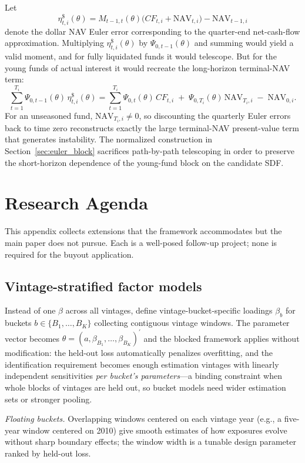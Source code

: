\documentclass[11pt]{article}
\begin{document}
Let
\[
\eta^{\$}_{t,i}(\theta)
=
M_{t-1,t}(\theta)\bigl(CF_{t,i}+\mathrm{NAV}_{t,i}\bigr)
-\mathrm{NAV}_{t-1,i}
\]
denote the dollar NAV Euler error corresponding to the quarter-end net-cash-flow approximation. Multiplying \(\eta^{\$}_{t,i}(\theta)\) by \(\Psi_{0,t-1}(\theta)\) and summing would yield a valid moment, and for fully liquidated funds it would telescope. But for the young funds of actual interest it would recreate the long-horizon terminal-NAV term:
\[
\sum_{t=1}^{T_i}\Psi_{0,t-1}(\theta)\,\eta^{\$}_{t,i}(\theta)
=
\sum_{t=1}^{T_i}\Psi_{0,t}(\theta)\,CF_{t,i}
\;+\;
\Psi_{0,T_i}(\theta)\,\mathrm{NAV}_{T_i,i}
\;-\;
\mathrm{NAV}_{0,i}.
\]
For an unseasoned fund, \(\mathrm{NAV}_{T_i,i}\neq 0\), so discounting the quarterly Euler errors back to time zero reconstructs exactly the large terminal-NAV present-value term that generates instability. The normalized construction in Section~\ref{sec:euler_block} sacrifices path-by-path telescoping in order to preserve the short-horizon dependence of the young-fund block on the candidate SDF.

\section{Research Agenda}
\label{app:agenda}

This appendix collects extensions that the framework accommodates but the main paper does not pursue. Each is a well-posed follow-up project; none is required for the buyout application.

\subsection{Vintage-stratified factor models}
\label{app:vintage_betas}

Instead of one \(\beta\) across all vintages, define vintage-bucket-specific loadings \(\beta_b\) for buckets \(b\in\{B_1,\ldots,B_K\}\) collecting contiguous vintage windows. The parameter vector becomes \(\theta=(a,\beta_{B_1},\ldots,\beta_{B_K})^\prime\) and the blocked framework applies without modification: the held-out loss automatically penalizes overfitting, and the identification requirement becomes enough estimation vintages with linearly independent sensitivities \emph{per bucket's parameters}---a binding constraint when whole blocks of vintages are held out, so bucket models need wider estimation sets or stronger pooling.

\emph{Floating buckets.} Overlapping windows centered on each vintage year (e.g., a five-year window centered on 2010) give smooth estimates of how exposures evolve without sharp boundary effects; the window width is a tunable design parameter ranked by held-out loss.
\end{document}
